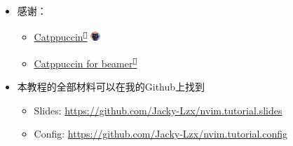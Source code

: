 \documentclass[aspectratio=169]{ctexbeamer}
\newcommand{\nerd}[1]{\texttt{#1}}
\newcommand{\link}[3][]{\href{#3}{#2\textsuperscript{\nerd{}}}}
\begin{document}
  \begin{frame}
    \begin{itemize}
      \item 感谢：
        \begin{itemize}
          \item \link{Catppuccin}{https://catppuccin.com/} \includegraphics[height=10pt]{./Figures/Catppuccin_logo.png}
          \item \link{Catppuccin for beamer}{https://github.com/atticus-sullivan/beamercolortheme}
        \end{itemize}
        \vspace{0.5cm}
      \item 本教程的全部材料可以在我的Github上找到
        \begin{itemize}
          \item Slides: \url{https://github.com/Jacky-Lzx/nvim.tutorial.slides}
          \item Config: \url{https://github.com/Jacky-Lzx/nvim.tutorial.config}
        \end{itemize}
    \end{itemize}
  \end{frame}
\end{document}

